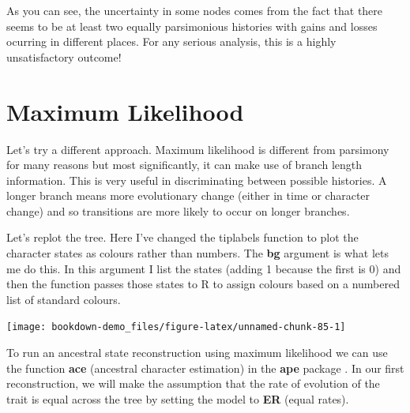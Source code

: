 \documentclass[
]{book}
\newenvironment{Shaded}{\begin{snugshade}}{\end{snugshade}}
\newcommand{\DataTypeTok}[1]{\textcolor[rgb]{0.13,0.29,0.53}{#1}}
\newcommand{\DecValTok}[1]{\textcolor[rgb]{0.00,0.00,0.81}{#1}}
\newcommand{\FloatTok}[1]{\textcolor[rgb]{0.00,0.00,0.81}{#1}}
\newcommand{\KeywordTok}[1]{\textcolor[rgb]{0.13,0.29,0.53}{\textbf{#1}}}
\newcommand{\NormalTok}[1]{#1}
\newcommand{\OperatorTok}[1]{\textcolor[rgb]{0.81,0.36,0.00}{\textbf{#1}}}
\newcommand{\OtherTok}[1]{\textcolor[rgb]{0.56,0.35,0.01}{#1}}
\begin{document}
As you can see, the uncertainty in some nodes comes from the fact that there seems to be at least two equally parsimonious histories with gains and losses ocurring in different places. For any serious analysis, this is a highly unsatisfactory outcome!

\hypertarget{maximum-likelihood}{%
\section{Maximum Likelihood}\label{maximum-likelihood}}

Let's try a different approach. Maximum likelihood is different from parsimony for many reasons but most significantly, it can make use of branch length information. This is very useful in discriminating between possible histories. A longer branch means more evolutionary change (either in time or character change) and so transitions are more likely to occur on longer branches.

Let's replot the tree. Here I've changed the tiplabels function to plot the character states as colours rather than numbers. The \textbf{bg} argument is what lets me do this. In this argument I list the states (adding 1 because the first is 0) and then the function passes those states to R to assign colours based on a numbered list of standard colours.

\begin{Shaded}
\end{Shaded}

\begin{center}\texttt{[image: bookdown-demo\_files/figure-latex/unnamed-chunk-85-1]} \end{center}

To run an ancestral state reconstruction using maximum likelihood we can use the function \textbf{ace} (ancestral character estimation) in the \textbf{ape} package \citep{ape}. In our first reconstruction, we will make the assumption that the rate of evolution of the trait is equal across the tree by setting the model to \textbf{ER} (equal rates).
\end{document}
